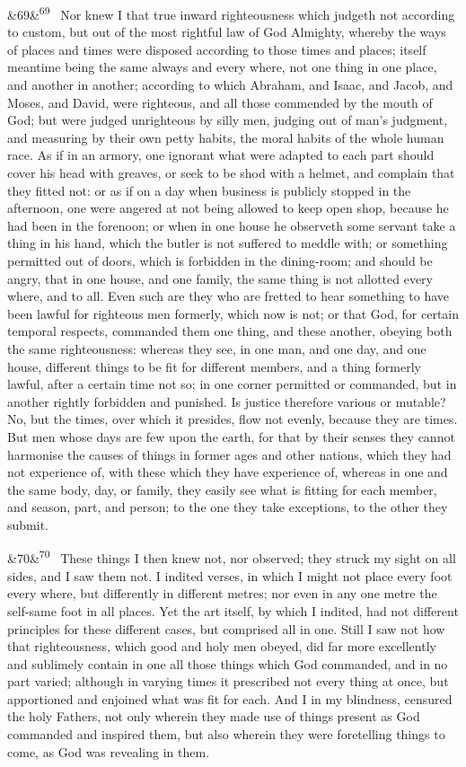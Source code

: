 \documentclass[12pt]{article}
\newcommand{\para}[1][]{\par\noindent\ifx&#1&\else\textsuperscript{\footnotesize #1}~\fi}
\begin{document}
\para[69] Nor knew I that true inward righteousness which judgeth not according to custom, but out of the most rightful law of God Almighty, whereby the ways of places and times were disposed according to those times and places; itself meantime being the same always and every where, not one thing in one place, and another in another; according to which Abraham, and Isaac, and Jacob, and Moses, and David, were righteous, and all those commended by the mouth of God; but were judged unrighteous by silly men, judging out of man's judgment, and measuring by their own petty habits, the moral habits of the whole human race. As if in an armory, one ignorant what were adapted to each part should cover his head with greaves, or seek to be shod with a helmet, and complain that they fitted not: or as if on a day when business is publicly stopped in the afternoon, one were angered at not being allowed to keep open shop, because he had been in the forenoon; or when in one house he observeth some servant take a thing in his hand, which the butler is not suffered to meddle with; or something permitted out of doors, which is forbidden in the dining-room; and should be angry, that in one house, and one family, the same thing is not allotted every where, and to all. Even such are they who are fretted to hear something to have been lawful for righteous men formerly, which now is not; or that God, for certain temporal respects, commanded them one thing, and these another, obeying both the same righteousness: whereas they see, in one man, and one day, and one house, different things to be fit for different members, and a thing formerly lawful, after a certain time not so; in one corner permitted or commanded, but in another rightly forbidden and punished. Is justice therefore various or mutable? No, but the times, over which it presides, flow not evenly, because they are times. But men whose days are few upon the earth, for that by their senses they cannot harmonise the causes of things in former ages and other nations, which they had not experience of, with these which they have experience of, whereas in one and the same body, day, or family, they easily see what is fitting for each member, and season, part, and person; to the one they take exceptions, to the other they submit.

\para[70] These things I then knew not, nor observed; they struck my sight on all sides, and I saw them not. I indited verses, in which I might not place every foot every where, but differently in different metres; nor even in any one metre the self-same foot in all places. Yet the art itself, by which I indited, had not different principles for these different cases, but comprised all in one. Still I saw not how that righteousness, which good and holy men obeyed, did far more excellently and sublimely contain in one all those things which God commanded, and in no part varied; although in varying times it prescribed not every thing at once, but apportioned and enjoined what was fit for each. And I in my blindness, censured the holy Fathers, not only wherein they made use of things present as God commanded and inspired them, but also wherein they were foretelling things to come, as God was revealing in them.
\end{document}

